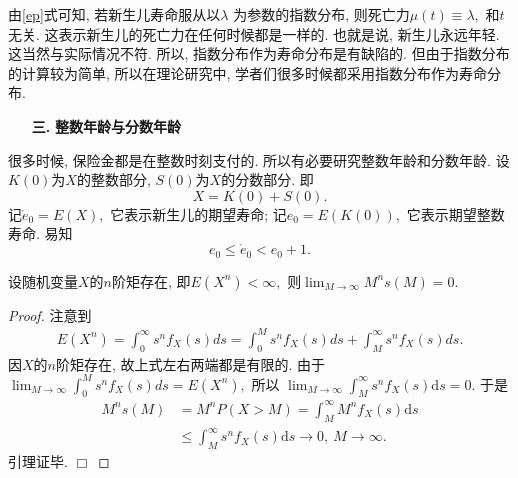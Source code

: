 \documentclass[a4paper,10pt]{ctexbook}
\newcommand{\hei}{\CJKfamily{hei}}      %
\def\qed{\hfill$\Box$\medskip}
\def\rto{\rightarrow\infty}
\def\no{\nonumber}
\begin{document}
\begin{remark}
    由\eqref{ep}式可知, 若新生儿寿命服从以$\lambda$ 为参数的指数分布, 则死亡力$\mu(t)\equiv \lambda,$ 和$t$无关. 这表示新生儿的死亡力在任何时候都是一样的. 也就是说, 新生儿永远年轻. 这当然与实际情况不符. 所以, 指数分布作为寿命分布是有缺陷的. 但由于指数分布的计算较为简单, 所以在理论研究中, 学者们很多时候都采用指数分布作为寿命分布.
\end{remark}
\begin{itemize}
    \item[{\bf\hei 三.}]{\hei\bf 整数年龄与分数年龄}
\end{itemize}
很多时候, 保险金都是在整数时刻支付的. 所以有必要研究整数年龄和分数年龄. 设$K(0)$为$X$的整数部分, $S(0)$为$X$的分数部分. 即
$$X = K(0) + S(0).$$
记$\mathring{e}_0 = E(X),$ 它表示新生儿的期望寿命; 记$e_0 = E(K(0)),$ 它表示期望整数寿命. 易知
\begin{equation*}
    e_0 \le \mathring{e}_0 < e_0 + 1.
\end{equation*}

\begin{lemma}\label{lemm0}
    设随机变量$X$的$n$阶矩存在, 即$E(X^n) < \infty,$ 则$\lim_{M \rightarrow \infty}M^ns(M) = 0.$
\end{lemma}
\begin{proof} 注意到
    \begin{align}
        E(X^n)=\int_{0}^\infty s^n f_X(s)ds=\int_0^Ms^n f_X(s)ds +\int_{M}^\infty s^n f_X(s)ds.
    \end{align}
    因$X$的$n$阶矩存在, 故上式左右两端都是有限的. 由于 $\lim_{M\rto} \int_0^Ms^n f_X(s)ds=E(X^n),$ 所以
    $\lim_{M\rto}\int_{M}^{\infty} s^nf_X(s)\mathrm{d}s=0.$ 于是
    \begin{align}
        M^n s(M) & = M^nP(X>M)
        =    \int_{M}^{\infty} M^nf_X(s)\mathrm{d}s  \no                                 \\
                 & \leq \int_{M}^{\infty} s^nf_X(s)\mathrm{d}s \rightarrow 0,\ M\rto.\no
    \end{align}
    引理证毕. \qed
\end{proof}
\end{document}
